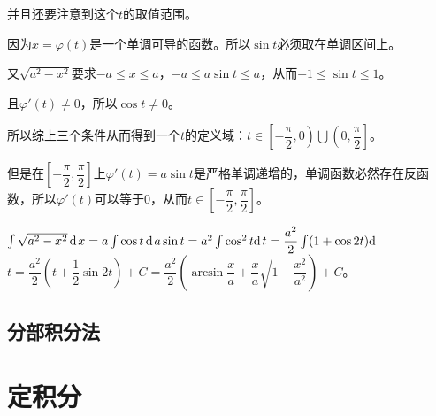 \documentclass[UTF8, 12pt]{ctexart}
\begin{document}
并且还要注意到这个$t$的取值范围。

因为$x=\varphi(t)$是一个单调可导的函数。所以$\sin t$必须取在单调区间上。

又$\sqrt{a^2-x^2}$要求$-a\leqslant x\leqslant a$，$-a\leqslant a\sin t\leqslant a$，从而$-1\leqslant\sin t\leqslant 1$。

且$\varphi'(t)\neq 0$，所以$\cos t\neq 0$。

所以综上三个条件从而得到一个$t$的定义域：$t\in\left[-\dfrac{\pi}{2},0\right)\bigcup\left(0,\dfrac{\pi}{2}\right]$。

但是在$\left[-\dfrac{\pi}{2},\dfrac{\pi}{2}\right]$上$\varphi'(t)=a\sin t$是严格单调递增的，单调函数必然存在反函数，所以$\varphi'(t)$可以等于0，从而$t\in\left[-\dfrac{\pi}{2},\dfrac{\pi}{2}\right]$。

$\int\sqrt{a^2-x^2}\,\rm{d}$$x=a\int\cos t\,\rm{d}$$a\sin t=a^2\int\cos^2t\rm{d}$$t=\dfrac{a^2}{2}\int(1+\cos 2t)\rm{d}$$t=\dfrac{a^2}{2}\left(t+\dfrac{1}{2}\sin 2t\right)+C=\dfrac{a^2}{2}\left(\arcsin\dfrac{x}{a}+\dfrac{x}{a}\sqrt{1-\dfrac{x^2}{a^2}}\right)+C$。


\subsection{分部积分法}

\section{定积分}
\end{document}
